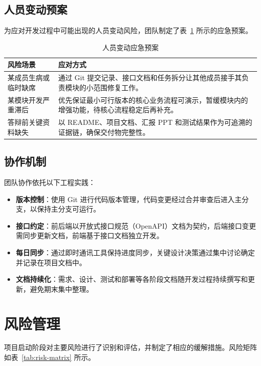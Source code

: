 \subsection{人员变动预案}

为应对开发过程中可能出现的人员变动风险，团队制定了表~\ref{tab:personnel-contingency} 所示的应急预案。

\begin{table}[H]
\centering
\caption{人员变动应急预案}
\label{tab:personnel-contingency}
\begin{tabular}{p{3.2cm}p{10cm}}
\toprule
\textbf{风险场景} & \textbf{应对方式} \\
\midrule
某成员生病或临时缺席 & 通过 Git 提交记录、接口文档和任务拆分让其他成员接手其负责模块的小范围修复工作。 \\
\addlinespace
某模块开发严重滞后 & 优先保证最小可行版本的核心业务流程可演示，暂缓模块内的增强功能，待核心流程稳定后再补充。 \\
\addlinespace
答辩前关键资料缺失 & 以 README、项目文档、汇报 PPT 和测试结果作为可追溯的证据链，确保交付物完整性。 \\
\bottomrule
\end{tabular}
\end{table}

\subsection{协作机制}

团队协作依托以下工程实践：

\begin{itemize}
  \item \textbf{版本控制}：使用 Git 进行代码版本管理，代码变更经过合并审查后进入主分支，以保持主分支可运行。
  \item \textbf{接口约定}：前后端以开放式接口规范（OpenAPI）文档为契约，后端接口变更需同步更新文档，前端基于接口文档独立开发。
  \item \textbf{每日同步}：通过即时通讯工具保持进度同步，关键设计决策通过集中讨论确定并记录在项目文档中。
  \item \textbf{文档持续化}：需求、设计、测试和部署等各阶段文档随开发过程持续撰写和更新，避免期末集中整理。
\end{itemize}

\section{风险管理}

项目启动阶段对主要风险进行了识别和评估，并制定了相应的缓解措施。风险矩阵如表~\ref{tab:risk-matrix} 所示。

